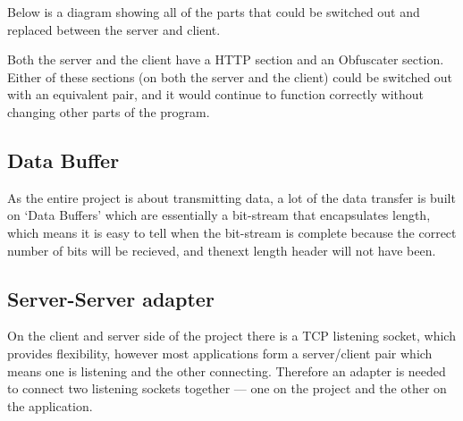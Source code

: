 Below is a diagram showing all of the parts that could be switched out and replaced between the server and client.
\begin{center}
\end{center}
Both the server and the client have a HTTP section and an Obfuscater section.
Either of these sections (on both the server and the client) could be switched out with an equivalent pair, and it would continue to function correctly without changing other parts of the program.

\subsection{Data Buffer}
As the entire project is about transmitting data, a lot of the data transfer is built on `Data Buffers' which are essentially a bit-stream that encapsulates length, which means it is easy to tell when the bit-stream is complete because the correct number of bits will be recieved, and thenext length header will not have been.

\subsection{Server-Server adapter}
On the client and server side of the project there is a TCP listening socket, which provides flexibility, however most applications form a server/client pair which means one is listening and the other connecting.
Therefore an adapter is needed to connect two listening sockets together --- one on the project and the other on the application.
